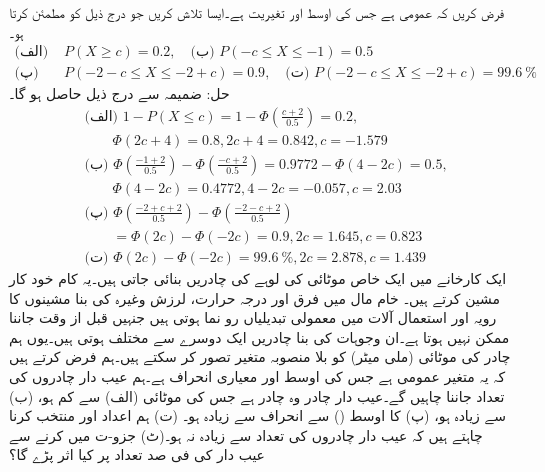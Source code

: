\quad
فرض کریں کہ  عمومی ہے جس کی اوسط  اور تغیریت  ہے۔ایسا  تلاش کریں جو درج ذیل کو مطمئن کرتا ہو۔
\begin{align*}
\text{(الف)} \,\,&P(X\ge c)=0.2,\quad \text{(ب)} \,\,P(-c\le X\le -1)=0.5\\
\text{(پ)} \,\,&P(-2-c\le X\le -2+c)=0.9,\quad \text{(ت)} \,\,P(-2-c\le X\le -2+c)=\SI{99.6}{\percent}
\end{align*}
حل:\quad
ضمیمہ  سے  درج ذیل حاصل ہو گا۔
\begin{align*}
&\text{(الف)}  \,\, 1-P(X\le c)=1-\Phi(\frac{c+2}{0.5})=0.2,\\
&\quad \quad \Phi(2c+4)=0.8, 2c+4=0.842,c=-1.579\\
&\text{(ب)}  \,\, \Phi(\frac{-1+2}{0.5})-\Phi(\frac{-c+2}{0.5})=0.9772-\Phi(4-2c)=0.5,\\
&\quad \quad \Phi(4-2c)=0.4772, 4-2c=-0.057, c=2.03\\
&\text{(پ)}  \,\,\Phi(\frac{-2+c+2}{0.5})-\Phi(\frac{-2-c+2}{0.5})\\
&\quad \quad =\Phi(2c)-\Phi(-2c)=0.9,2c=1.645,c=0.823\\
&\text{(ت)}  \,\,\Phi(2c)-\Phi(-2c)=\SI{99.6}{\percent}, 2c=2.878,c=1.439
\end{align*}
\quad
ایک کارخانے میں ایک خاص موٹائی کی لوہے کی چادریں بنائی جاتی ہیں۔یہ کام خود کار مشین کرتے ہیں۔ خام مال میں فرق اور درجہ حرارت، لرزش وغیرہ کی بنا  مشینوں کا رویہ اور استعمال آلات میں معمولی تبدیلیاں رو نما ہوتی ہیں جنہیں قبل از وقت جاننا ممکن نہیں ہوتا ہے۔ان وجوہات کی بنا چادریں ایک دوسرے سے مختلف ہوتی ہیں۔یوں ہم چادر کی موٹائی  (ملی میٹر) کو بلا منصوبہ متغیر تصور کر سکتے ہیں۔ہم فرض کرتے ہیں کہ یہ متغیر عمومی ہے جس کی اوسط  اور معیاری انحراف  ہے۔ہم عیب دار چادروں کی تعداد جاننا چاہیں گے۔عیب دار چادر وہ چادر ہے  جس کی موٹائی (الف)  سے کم ہو، (ب)  سے زیادہ ہو، (پ) کا اوسط () سے انحراف  سے زیادہ ہو۔ (ت) ہم اعداد  اور  منتخب کرنا چاہتے ہیں کہ عیب دار چادروں کی تعداد  سے زیادہ نہ ہو۔(ٹ) جزو-ت میں
  کرنے سے عیب دار کی فی صد تعداد پر کیا اثر پڑے گا؟

